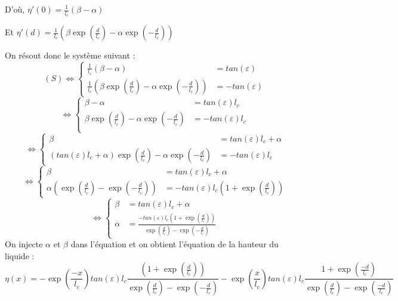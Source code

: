 \documentclass[10pt,a4paper]{article}
\begin{document}
D'où, $\eta\prime(0) = \frac{1 }{l_{c}}(\beta - \alpha)$
\newline

Et $\eta\prime(d) = \frac{ 1}{l_{c}}(\beta\exp({\frac{ d}{l_{c}}}) - \alpha\exp({-\frac{ d}{l_{c}}}))$
\newline

On résout donc le système suivant : 
\begin{equation}
(S) \Longleftrightarrow
\begin{cases}
\frac{1 }{l_{c}}(\beta - \alpha) &=tan(\varepsilon) \\
\frac{ 1}{l_{c}}(\beta\exp({\frac{ d}{l_{c}}}) - \alpha\exp({-\frac{ d}{l_{c}}})) &= -tan(\varepsilon)
\end{cases}
\end{equation}
\begin{equation}
\Longleftrightarrow
\begin{cases}
\beta - \alpha &=tan(\varepsilon)l_{c} \\
\beta\exp({\frac{ d}{l_{c}}}) - \alpha\exp({-\frac{ d}{l_{c}}}) &= -tan(\varepsilon)l_{c} \\
\end{cases}
\end{equation}
\begin{equation}
\Longleftrightarrow
\begin{cases}
\beta &=tan(\varepsilon)l_{c} + \alpha \\
(tan(\varepsilon)l_{c} + \alpha)\exp({\frac{ d}{l_{c}}}) - \alpha\exp({-\frac{ d}{l_{c}}}) &= -tan(\varepsilon)l_{c} 
\end{cases}
\end{equation}
\begin{equation}
\Longleftrightarrow
\begin{cases}
\beta &=tan(\varepsilon)l_{c} + \alpha \\
\alpha(\exp({\frac{ d}{l_{c}}}) - \exp({-\frac{ d}{l_{c}}})) &= -tan(\varepsilon)l_{c} (1 + \exp({\frac{ d}{l_{c}}}))
\end{cases}
\end{equation}
\begin{equation}
\Longleftrightarrow
\begin{cases}
\beta &=tan(\varepsilon)l_{c} + \alpha \\
\alpha &= \frac{ -tan(\varepsilon)l_{c} (1 + \exp({\frac{ d}{l_{c}}}))}{\exp({\frac{ d}{l_{c}}}) - \exp({-\frac{ d}{l_{c}}})}
\end{cases}
\end{equation}
\newline
On injecte $\alpha$ et $\beta$ dans l'équation et on obtient l'équation de la hauteur du liquide : 
\begin{equation}
	\eta(x)=-\exp({\frac{ -x}{l_{c}}})tan(\varepsilon)l_{c}\frac{ (1 + \exp({\frac{ d}{l_{c}}}))}{\exp({\frac{ d}{l_{c}}}) - \exp({-\frac{ d}{l_{c}}})} -\exp({\frac{ x}{l_{c}}})tan(\varepsilon)l_{c}\frac{1 + \exp({\frac{ -d}{l_{c}}})}{\exp({\frac{ d}{l_{c}}}) - \exp({\frac{ -d}{l_{c}}})}
\end{equation}
\end{document}
